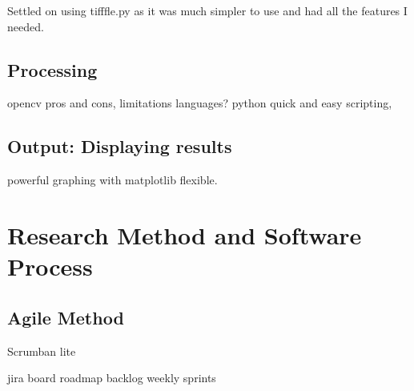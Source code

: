 Settled on using tifffle.py \cite{tifffle} as it was much simpler to use and had all the features I needed.

\subsection{Processing}

opencv pros and cons, limitations
languages? python quick and easy scripting, 


\subsection{Output: Displaying results}

powerful graphing with matplotlib flexible.



\section{Research Method and Software Process}
\begin{comment}
You need to describe briefly the life cycle model or research method that you used. You do not need to write about all of the different process models that you are aware of. Focus on the process model or research method that you have used. It is possible that you needed to adapt an existing method to suit your project; clearly identify what you used and how you adapted it for your needs.

For the research-oriented projects, there needs to be a suitable process for the construction of the software elements that support your work.
\end{comment}


\subsection{Agile Method}
\begin{comment}
what is it?
why am i using it?
\end{comment}

Scrumban lite

jira board
roadmap
backlog
weekly sprints



